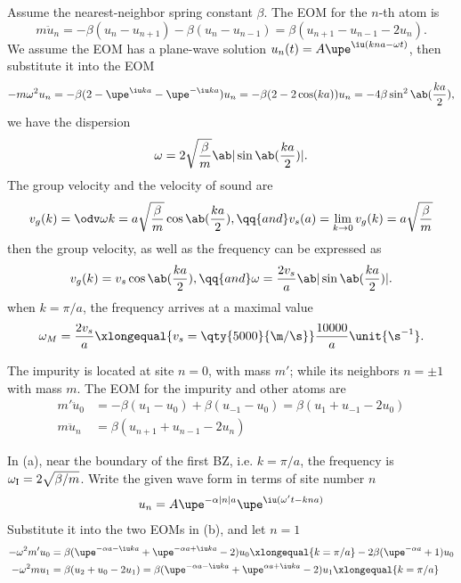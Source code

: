 \begin{solution}\leavevmode
  \begin{enumext}[label = (\alph*)]
    \item Assume the nearest-neighbor spring constant $\beta$.
    The EOM for the $n$-th atom is
    \[
      m\ddot u_n = -\beta(u_n - u_{n+1}) - \beta(u_n - u_{n-1})
    = \beta(u_{n+1} - u_{n-1} - 2u_n).
    \]
    We assume the EOM has a plane-wave solution
    $u_n(t) = A\upe^{\iu(kna-\omega t)}$, then substitute it into the EOM
    \[  
      -m\omega^2u_n = -\beta(2 - \upe^{\iu ka} - \upe^{-\iu ka})u_n
    = -\beta(2 - 2\cos(ka))u_n = -4\beta\sin^2\ab(\frac{ka}{2}),
    \]
    we have the dispersion
    \[
      \omega = 2\sqrt{\frac\beta m}\ab|\sin\ab(\frac{ka}{2})|.
    \]
    The group velocity and the velocity of sound are
    \[
      v_g(k) = \odv\omega k = a\sqrt{\frac\beta m} \cos\ab(\frac{ka}{2}),
      \qq{and}
      v_s(a) = \lim_{k\to0} v_g(k) = a\sqrt{\frac\beta m}
    \]
    then the group velocity, as well as the frequency can be expressed as
    \[
      v_g(k) = v_s \cos\ab(\frac{ka}{2}), \qq{and}
      \omega = \frac{2v_s}a \ab|\sin\ab(\frac{ka}{2})|.
    \]
    when $k = \pi/a$, the frequency arrives at a maximal value
    \[
      \omega_M = \frac{2v_s}{a} \xlongequal{v_s = \qty{5000}{\m/\s}}
      \frac{10000}{a} \unit{\s^{-1}}.
    \]
    \item The impurity is located at site $n = 0$, with mass $m'$;
    while its neighbors $n = \pm1$ with mass $m$.
    The EOM for the impurity and other atoms are
    \begin{align*}
      m'\ddot u_0 & = -\beta(u_1 - u_0) + \beta(u_{-1} - u_0)
    = \beta(u_1 + u_{-1} - 2u_0)\\
      m\ddot u_n & = \beta(u_{n+1} + u_{n-1} - 2u_n)
    \end{align*}
    \item In (a), near the boundary of the first BZ, i.e. $k = \pi/a$,
    the frequency is $\omega_\text I = 2\sqrt{\beta/m}$.
    Write the given wave form in terms of site number $n$
    \[
      u_n = A \upe^{-\alpha|n|a} \upe^{\iu(\omega't - kna)}
    \]
    Substitute it into the two EOMs in (b), and let $n = 1$
    \begin{align*}
      -\omega^2m'u_0 & = \beta(\upe^{-\alpha a-\iu ka} + \upe^{-\alpha a+\iu ka} - 2)u_0 \xlongequal{k = \pi/a} -2\beta(\upe^{-\alpha a} + 1) u_0\\
      -\omega^2m u_1 & = \beta(u_2 + u_0 - 2u_1) = \beta(\upe^{-\alpha a-\iu ka} + \upe^{\alpha a+\iu ka} - 2)u_1 \xlongequal{k = \pi/a}

\end{align*}
\end{enumext}
\end{solution}
